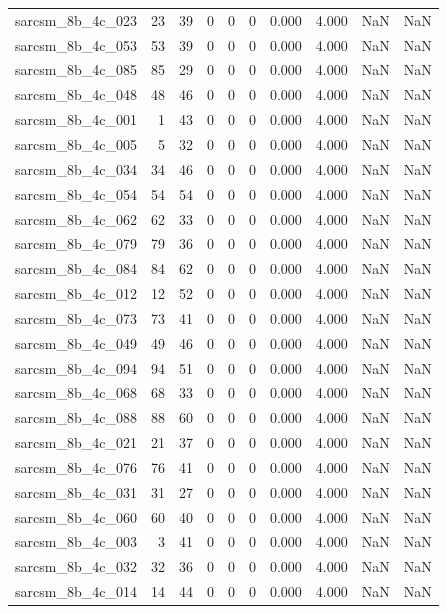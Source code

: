 \documentclass{article}
\begin{document}
\begin{longtable}{lrrrrrrrrr}
sarcsm\_8b\_4c\_023 & 23 & 39 & 0 & 0 & 0 & 0.000 & 4.000 & NaN & NaN \\
sarcsm\_8b\_4c\_053 & 53 & 39 & 0 & 0 & 0 & 0.000 & 4.000 & NaN & NaN \\
sarcsm\_8b\_4c\_085 & 85 & 29 & 0 & 0 & 0 & 0.000 & 4.000 & NaN & NaN \\
sarcsm\_8b\_4c\_048 & 48 & 46 & 0 & 0 & 0 & 0.000 & 4.000 & NaN & NaN \\
sarcsm\_8b\_4c\_001 & 1 & 43 & 0 & 0 & 0 & 0.000 & 4.000 & NaN & NaN \\
sarcsm\_8b\_4c\_005 & 5 & 32 & 0 & 0 & 0 & 0.000 & 4.000 & NaN & NaN \\
sarcsm\_8b\_4c\_034 & 34 & 46 & 0 & 0 & 0 & 0.000 & 4.000 & NaN & NaN \\
sarcsm\_8b\_4c\_054 & 54 & 54 & 0 & 0 & 0 & 0.000 & 4.000 & NaN & NaN \\
sarcsm\_8b\_4c\_062 & 62 & 33 & 0 & 0 & 0 & 0.000 & 4.000 & NaN & NaN \\
sarcsm\_8b\_4c\_079 & 79 & 36 & 0 & 0 & 0 & 0.000 & 4.000 & NaN & NaN \\
sarcsm\_8b\_4c\_084 & 84 & 62 & 0 & 0 & 0 & 0.000 & 4.000 & NaN & NaN \\
sarcsm\_8b\_4c\_012 & 12 & 52 & 0 & 0 & 0 & 0.000 & 4.000 & NaN & NaN \\
sarcsm\_8b\_4c\_073 & 73 & 41 & 0 & 0 & 0 & 0.000 & 4.000 & NaN & NaN \\
sarcsm\_8b\_4c\_049 & 49 & 46 & 0 & 0 & 0 & 0.000 & 4.000 & NaN & NaN \\
sarcsm\_8b\_4c\_094 & 94 & 51 & 0 & 0 & 0 & 0.000 & 4.000 & NaN & NaN \\
sarcsm\_8b\_4c\_068 & 68 & 33 & 0 & 0 & 0 & 0.000 & 4.000 & NaN & NaN \\
sarcsm\_8b\_4c\_088 & 88 & 60 & 0 & 0 & 0 & 0.000 & 4.000 & NaN & NaN \\
sarcsm\_8b\_4c\_021 & 21 & 37 & 0 & 0 & 0 & 0.000 & 4.000 & NaN & NaN \\
sarcsm\_8b\_4c\_076 & 76 & 41 & 0 & 0 & 0 & 0.000 & 4.000 & NaN & NaN \\
sarcsm\_8b\_4c\_031 & 31 & 27 & 0 & 0 & 0 & 0.000 & 4.000 & NaN & NaN \\
sarcsm\_8b\_4c\_060 & 60 & 40 & 0 & 0 & 0 & 0.000 & 4.000 & NaN & NaN \\
sarcsm\_8b\_4c\_003 & 3 & 41 & 0 & 0 & 0 & 0.000 & 4.000 & NaN & NaN \\
sarcsm\_8b\_4c\_032 & 32 & 36 & 0 & 0 & 0 & 0.000 & 4.000 & NaN & NaN \\
sarcsm\_8b\_4c\_014 & 14 & 44 & 0 & 0 & 0 & 0.000 & 4.000 & NaN & NaN \\

\end{longtable}
\end{document}
